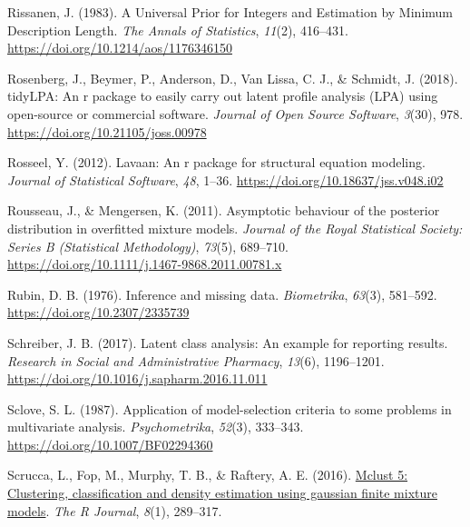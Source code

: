 \documentclass[
  ,man,floatsintext]{apa6}
\newlength{\cslhangindent}
\newlength{\cslentryspacingunit} %
\newenvironment{CSLReferences}[2] %
 {%
  \setlength{\parindent}{0pt}
  \ifodd #1
  \let\oldpar\par
  \def\par{\hangindent=\cslhangindent\oldpar}
  \fi
  \setlength{\parskip}{#2\cslentryspacingunit}
 }%
 {}
\begin{document}
\begin{CSLReferences}{1}{0}
\leavevmode{}%
Rissanen, J. (1983). {A Universal Prior for Integers and Estimation by Minimum Description Length}. \emph{The Annals of Statistics}, \emph{11}(2), 416--431. \url{https://doi.org/10.1214/aos/1176346150}

\leavevmode{}%
Rosenberg, J., Beymer, P., Anderson, D., Van Lissa, C. J., \& Schmidt, J. (2018). {tidyLPA}: An r package to easily carry out latent profile analysis ({LPA}) using open-source or commercial software. \emph{Journal of Open Source Software}, \emph{3}(30), 978. \url{https://doi.org/10.21105/joss.00978}

\leavevmode{}%
Rosseel, Y. (2012). Lavaan: An r package for structural equation modeling. \emph{Journal of Statistical Software}, \emph{48}, 1--36. \url{https://doi.org/10.18637/jss.v048.i02}

\leavevmode{}%
Rousseau, J., \& Mengersen, K. (2011). Asymptotic behaviour of the posterior distribution in overfitted mixture models. \emph{Journal of the Royal Statistical Society: Series B (Statistical Methodology)}, \emph{73}(5), 689--710. \url{https://doi.org/10.1111/j.1467-9868.2011.00781.x}

\leavevmode{}%
Rubin, D. B. (1976). Inference and missing data. \emph{Biometrika}, \emph{63}(3), 581--592. \url{https://doi.org/10.2307/2335739}

\leavevmode{}%
Schreiber, J. B. (2017). Latent class analysis: An example for reporting results. \emph{Research in Social and Administrative Pharmacy}, \emph{13}(6), 1196--1201. \url{https://doi.org/10.1016/j.sapharm.2016.11.011}

\leavevmode{}%
Sclove, S. L. (1987). Application of model-selection criteria to some problems in multivariate analysis. \emph{Psychometrika}, \emph{52}(3), 333--343. \url{https://doi.org/10.1007/BF02294360}

\leavevmode{}%
Scrucca, L., Fop, M., Murphy, T. B., \& Raftery, A. E. (2016). \href{https://www.ncbi.nlm.nih.gov/pmc/articles/PMC5096736}{Mclust 5: Clustering, classification and density estimation using gaussian finite mixture models}. \emph{The R Journal}, \emph{8}(1), 289--317.


\end{CSLReferences}
\end{document}
